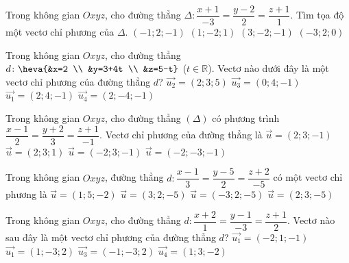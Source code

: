 \begin{ex}%
	Trong không gian $Oxyz$, cho đường thẳng $\Delta \colon \dfrac{x+1}{-3}=\dfrac{y-2}{2}=\dfrac{z+1}{1}$. Tìm tọa độ một vectơ chỉ phương của $\Delta$.
	\choice
	{$(-1;2;-1)$}
	{$(1;-2;1)$}
	{\True $(3;-2;-1)$}
	{$(-3;2;0)$}
\end{ex}

\begin{ex}%
	Trong không gian $Oxyz$, cho đường thẳng $d \colon \heva{&x=2 \\ &y=3+4t \\ &z=5-t}$ ($t \in \mathbb{R}$). Vectơ nào dưới đây là một vectơ chỉ phương của đường thẳng $d$?
	\choice
	{$\overrightarrow{u_2}=(2;3;5)$}
	{\True $\overrightarrow{u_3}=(0;4;-1)$}
	{$\overrightarrow{u_1}=(2;4;-1)$}
	{$\overrightarrow{u_4}=(2;-4;-1)$}
\end{ex}

\begin{ex}%
	Trong không gian $Oxyz$, cho đường thẳng $(\Delta)$ có phương trình $\dfrac{x-1}{2}=\dfrac{y+2}{3}=\dfrac{z+1}{-1}$. Vectơ chỉ phương của đường thẳng là
	\choice
	{\True $\overrightarrow{u}=(2;3;-1)$}
	{$\overrightarrow{u}=(2;3;1)$}
	{$\overrightarrow{u}=(-2;3;-1)$}
	{$\overrightarrow{u}=(-2;-3;-1)$}
\end{ex}

\begin{ex}%
	Trong không gian $Oxyz$, đường thẳng $d \colon \dfrac{x-1}{3}=\dfrac{y-5}{2}=\dfrac{z+2}{-5}$ có một vectơ chỉ phương là
	\choice
	{$\overrightarrow{u}=(1;5;-2)$}
	{\True $\overrightarrow{u}=(3;2;-5)$}
	{$\overrightarrow{u}=(-3;2;-5)$}
	{$\overrightarrow{u}=(2;3;-5)$}
\end{ex}
\begin{ex}%
	Trong không gian $Oxyz$, cho đường thẳng $d \colon \dfrac{x+2}{1}=\dfrac{y-1}{-3}=\dfrac{z+1}{2}$. Vectơ nào sau đây là một vectơ chỉ phương của đường thẳng $d$?
	\choice
	{$\overrightarrow{u_1}=(-2;1;-1)$}
	{\True $\overrightarrow{u_1}=(1;-3;2)$}
	{$\overrightarrow{u_3}=(-1;-3;2)$}
	{$\overrightarrow{u_4}=(1;3;-2)$}
\end{ex}

